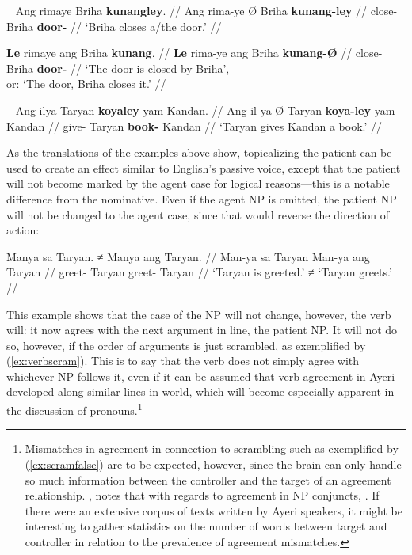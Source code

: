 \xe

\pex~
\a\begingl
	\gla Ang rimaye {} Briha \textbf{kunangley}. //
	\glb Ang rima-ye Ø Briha \textbf{kunang-ley} //
	\glc \AgtT{} close-\TsgF{} \Top{} Briha \textbf{door-\PargI{}} //
	\glft `Briha closes a/the door.' //
\endgl

\a\begingl
	\gla \textbf{Le} rimaye ang Briha \textbf{kunang}. //
	\glb \textbf{Le} rima-ye ang Briha \textbf{kunang-Ø} //
	\glc \textbf{\PatTI{}} close-\TsgF{} \Aarg{} Briha 
		\textbf{door-\Top{}} //
	\glft `The door is closed by Briha',\\
		or: `The door, Briha closes it.' //
\endgl

\xe

\ex~
\begingl
	\gla Ang ilya {} Taryan \textbf{koyaley} yam Kandan. //
	\glb Ang il-ya Ø Taryan \textbf{koya-ley} yam Kandan //
	\glc \AgtT{} give-\TsgM{} \Top{} Taryan \textbf{book-\PargI{}} \Dat{} 
		Kandan //
	\glft `Taryan gives Kandan a book.' //
\endgl

\xe

As the translations of the examples above show, topicalizing the patient can be 
used to create an effect similar to English's passive voice, except that the 
patient will not become marked by the agent case for logical reasons---this is 
a notable difference from the nominative. Even if the agent NP is omitted, the 
patient NP will not be changed to the agent case, since that would reverse the 
direction of action:

\ex\begingl
	\gla Manya sa Taryan. ≠ Manya ang Taryan. //
	\glb Man-ya sa Taryan {} Man-ya ang Taryan //
	\glc greet-\TsgM{} \Parg{} Taryan {} greet-\TsgM{} \Aarg{} Taryan //
	\glft `Taryan is greeted.' ≠ `Taryan greets.' //
\endgl\xe

This example shows that the case of the NP will not change, however, the 
verb will: it now agrees with the next argument in line, the patient NP. It 
will not do so, however, if the order of arguments is just scrambled, as 
exemplified by (\ref{ex:verbscram}). This is to say that the verb does not 
simply agree with whichever NP follows it, even if it can be assumed that verb 
agreement in Ayeri developed along similar lines in-world, which will become 
especially apparent in the discussion of pronouns.\footnote{Mismatches in 
agreement in connection to scrambling such as exemplified by 
(\ref{ex:scramfalse}) are to be expected, however, since the brain can only 
handle so much information between the controller and the target of an 
agreement relationship. \citet{corbett2006}, notes that with regards to 
agreement in NP conjuncts, . If there were an extensive corpus of 
texts written by Ayeri speakers, it might be interesting to gather statistics 
on the number of words between target and controller in relation to the 
prevalence of agreement mismatches.}

